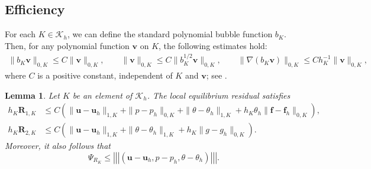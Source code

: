 \documentclass[10pt,a4paper]{article}
\newtheorem{lemma} {\bf Lemma}
\begin{document}
\subsection{Efficiency}
For each $K \in \mathcal{K}_h$, we can define the standard polynomial bubble function $b_K$. Then, for any polynomial function $\boldsymbol{v}$ on $K$, the following estimates hold:
\begin{align}\label{interior_bubb}
\| b_K \boldsymbol{v} \|_{0,K} \le C \| \boldsymbol{v} \|_{0,K}, 
\qquad
\| \boldsymbol{v} \|_{0,K} \le C \| b_K^{1/2} \boldsymbol{v} \|_{0,K},
\qquad
\| \nabla (b_K \boldsymbol{v}) \|_{0,K} \le C h_K^{-1} \| \boldsymbol{v} \|_{0,K},
\end{align}
where $C$ is a positive constant, independent of $K$ and $\boldsymbol{v}$; see \cite{MR3059294}.
\begin{lemma}\label{efficiency_1}
Let $K$ be an element of $\mathcal{K}_h$.   The local equilibrium residual satisfies
\begin{align*}
   h_K \boldsymbol{R}_{1,K} &\leq C \left( \| \boldsymbol{u} - \boldsymbol{u}_h \|_{1,K} + \|p-p_h\|_{0,K} + \| \theta - \theta_h \|_{1,K} + h_K \theta_h \| \boldsymbol{f}- \boldsymbol{f}_h \|_{0,K} \right), \\
     h_K \boldsymbol{R}_{2,K} &\leq C \left( \| \boldsymbol{u} - \boldsymbol{u}_h \|_{1,K} + \|\theta -\theta_h\|_{1,K} + h_K \| g - g_h \|_{0,K} \right).
\end{align*}
Moreover, it also follows that
$$
\Psi_{R_K} \leq \left|\!\left|\!\left| (\boldsymbol{u}-\boldsymbol{u}_h , p -p_h, \theta - \theta_h)\right|\!\right|\!\right|.
$$
\end{lemma}
\end{document}
